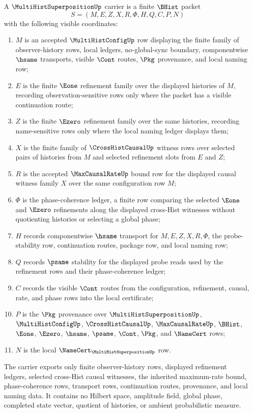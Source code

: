 \begin{definition}
\label{def:multi-hist-superposition-carrier}
A $\MultiHistSuperpositionUp$ carrier is a finite $\BHist$ packet
$$
S=(M,E,Z,X,R,\Phi,H,Q,C,P,N)
$$
with the following visible coordinates:
\begin{enumerate}
\item $M$ is an accepted $\MultiHistConfigUp$ row displaying the finite family of observer-history rows, local ledgers, no-global-sync boundary, componentwise $\hsame$ transports, visible $\Cont$ routes, $\Pkg$ provenance, and local naming row;
\item $E$ is the finite $\Eone$ refinement family over the displayed histories of $M$, recording observation-sensitive rows only where the packet has a visible continuation route;
\item $Z$ is the finite $\Ezero$ refinement family over the same histories, recording name-sensitive rows only where the local naming ledger displays them;
\item $X$ is the finite family of $\CrossHistCausalUp$ witness rows over selected pairs of histories from $M$ and selected refinement slots from $E$ and $Z$;
\item $R$ is the accepted $\MaxCausalRateUp$ bound row for the displayed causal witness family $X$ over the same configuration row $M$;
\item $\Phi$ is the phase-coherence ledger, a finite row comparing the selected $\Eone$ and $\Ezero$ refinements along the displayed cross-Hist witnesses without quotienting histories or selecting a global phase;
\item $H$ records componentwise $\hsame$ transport for $M,E,Z,X,R,\Phi$, the probe-stability row, continuation routes, package row, and local naming row;
\item $Q$ records $\psame$ stability for the displayed probe reads used by the refinement rows and their phase-coherence ledger;
\item $C$ records the visible $\Cont$ routes from the configuration, refinement, causal, rate, and phase rows into the local certificate;
\item $P$ is the $\Pkg$ provenance over $\MultiHistSuperpositionUp$, $\MultiHistConfigUp$, $\CrossHistCausalUp$, $\MaxCausalRateUp$, $\BHist$, $\Eone$, $\Ezero$, $\hsame$, $\psame$, $\Cont$, $\Pkg$, and $\NameCert$ rows;
\item $N$ is the local $\NameCert_{\MultiHistSuperpositionUp}$ row.
\end{enumerate}
The carrier exports only finite observer-history rows, displayed refinement ledgers, selected cross-Hist causal witnesses, the inherited maximum-rate bound, phase-coherence rows, transport rows, continuation routes, provenance, and local naming data. It contains no Hilbert space, amplitude field, global phase, completed state vector, quotient of histories, or ambient probabilistic measure.
\end{definition}

